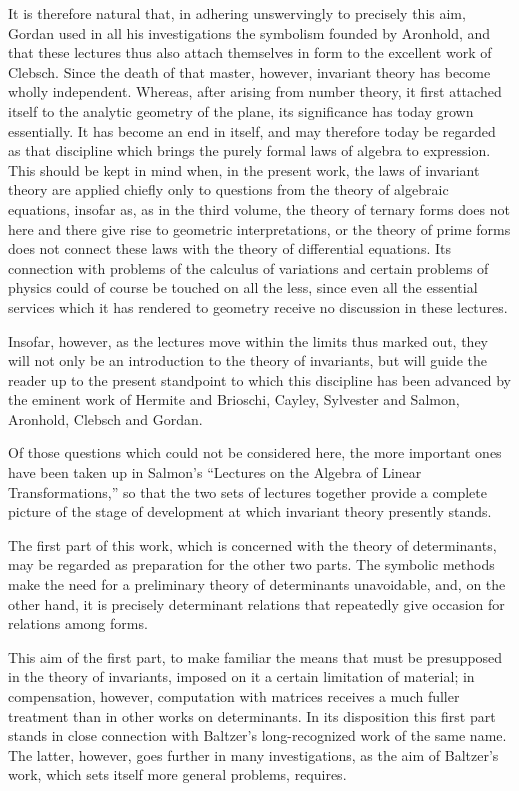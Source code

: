 \documentclass[10pt]{article}
\begin{document}
It is therefore natural that, in adhering unswervingly to precisely this aim, Gordan used in all his investigations the symbolism founded by Aronhold, and that these lectures thus also attach themselves in form to the excellent work of Clebsch. Since the death of that master, however, invariant theory has become wholly independent. Whereas, after arising from number theory, it first attached itself to the analytic geometry of the plane, its significance has today grown essentially. It has become an end in itself, and may therefore today be regarded as that discipline which brings the purely formal laws of algebra to expression. This should be kept in mind when, in the present work, the laws of invariant theory are applied chiefly only to questions from the theory of algebraic equations, insofar as, as in the third volume, the theory of ternary forms does not here and there give rise to geometric interpretations, or the theory of prime forms does not connect these laws with the theory of differential equations. Its connection with problems of the calculus of variations and certain problems of physics could of course be touched on all the less, since even all the essential services which it has rendered to geometry receive no discussion in these lectures.

Insofar, however, as the lectures move within the limits thus marked out, they will not only be an introduction to the theory of invariants, but will guide the reader up to the present standpoint to which this discipline has been advanced by the eminent work of Hermite and Brioschi, Cayley, Sylvester and Salmon, Aronhold, Clebsch and Gordan.

Of those questions which could not be considered here, the more important ones have been taken up in Salmon's “Lectures on the Algebra of Linear Transformations,” so that the two sets of lectures together provide a complete picture of the stage of development at which invariant theory presently stands.

The first part of this work, which is concerned with the theory of determinants, may be regarded as preparation for the other two parts. The symbolic methods make the need for a preliminary theory of determinants unavoidable, and, on the other hand, it is precisely determinant relations that repeatedly give occasion for relations among forms.

This aim of the first part, to make familiar the means that must be presupposed in the theory of invariants, imposed on it a certain limitation of material; in compensation, however, computation with matrices receives a much fuller treatment than in other works on determinants. In its disposition this first part stands in close connection with Baltzer's long-recognized work of the same name. The latter, however, goes further in many investigations, as the aim of Baltzer's work, which sets itself more general problems, requires.
\end{document}
